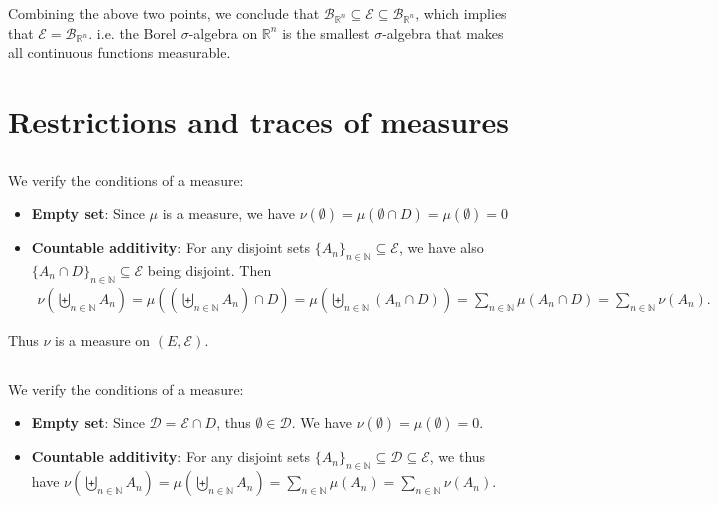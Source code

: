 \documentclass[11pt,a4paper]{article}
\numberwithin{equation}{section}%
\begin{document}
    Combining the above two points, we conclude that $ \mathcal{B}_{\mathbb{R}^n} \subseteq \mathcal{E} \subseteq \mathcal{B}_{\mathbb{R}^n} $, which implies that $ \mathcal{E} = \mathcal{B}_{\mathbb{R}^n} $. i.e. the Borel $ \sigma $-algebra on $ \mathbb{R}^n $ is the smallest $ \sigma $-algebra that makes all continuous functions measurable.












\section{Restrictions and traces of measures}

\subsection{}
We verify the conditions of a measure:
\begin{itemize}[topsep=2pt,itemsep=0pt]
    \item \textbf{Empty set}: Since $ \mu $ is a measure, we have $ \nu(\emptyset)=\mu (\emptyset \cap D) = \mu(\emptyset) =0 $
    \item \textbf{Countable additivity}: For any disjoint sets $ \{A_n\}_{n\in \mathbb{N}}\subseteq \mathcal{E}$, we have also $ \{A_n\cap D\}_{n\in \mathbb{N}}\subseteq \mathcal{E} $ being disjoint. Then
    \begin{align*}
        \nu(\biguplus_{n\in \mathbb{N}} A_n) = \mu\left( \left( \biguplus_{n\in \mathbb{N}} A_n \right) \cap D \right) = \mu\left( \biguplus_{n\in \mathbb{N}} (A_n\cap D) \right) = \sum_{n\in \mathbb{N}} \mu(A_n\cap D) = \sum_{n\in \mathbb{N}} \nu(A_n).
    \end{align*}   
    
\end{itemize}

Thus $ \nu $ is a measure on $ (E,\mathcal{E}) $.

\subsection{}

We verify the conditions of a measure:
\begin{itemize}[topsep=2pt,itemsep=0pt]
    \item \textbf{Empty set}: Since $ \mathcal{D}=\mathcal{E}\cap D $, thus $ \emptyset \in \mathcal{D} $. We have $ \nu(\emptyset) = \mu (\emptyset )=0 $.
    \item \textbf{Countable additivity}: For any disjoint sets $ \{A_n\}_{n\in \mathbb{N}}\subseteq \mathcal{D} \subseteq \mathcal{E}$, we thus have $ \nu (\biguplus_{n\in \mathbb{N}} A_n) = \mu \left( \biguplus_{n\in \mathbb{N}} A_n \right) = \sum_{n\in \mathbb{N}} \mu(A_n) = \sum_{n\in \mathbb{N}} \nu(A_n) $.
\end{itemize}
\end{document}
